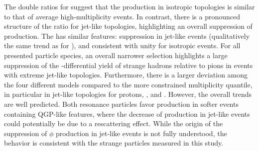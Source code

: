 The double ratios for \KSTAR suggest that the production in isotropic topologies is similar to that of average high-multiplicity events. In contrast, there is a pronounced structure of the ratio for jet-like topologies, highlighting an overall suppression of \KSTAR production. The \PHI has similar features: suppression in jet-like events (qualitatively the same trend as for \XI), and consistent with unity for isotropic events. For all presented particle species, an overall narrower \SOPT selection highlights a large suppression of the \pt-differential yield of strange hadrons relative to pions in events with extreme jet-like topologies. Furthermore, there is a larger deviation among the four different models compared to the more constrained multiplicity quantile, in particular in jet-like topologies for protons, \XI, and \KSTAR. However, the overall trends are well predicted. Both resonance particles favor production in softer events containing QGP-like features, where the decrease of \KSTAR production in jet-like events could potentially be due to a rescattering effect. While the origin of the suppression of $\phi$ production in jet-like events is not fully understood, the behavior is consistent with the strange particles measured in this study.

